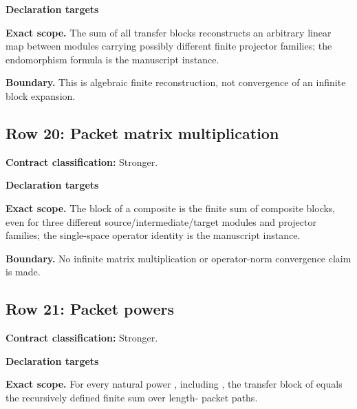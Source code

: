 \par\smallskip\textbf{Declaration targets}\par
{\small\noindent{}\par}
{\small\noindent{}\par}
\medskip\noindent\textbf{Exact scope.} The sum of all transfer blocks reconstructs an arbitrary linear map between modules carrying possibly different finite projector families; the endomorphism formula is the manuscript instance.
\par\smallskip\noindent\textbf{Boundary.} This is algebraic finite reconstruction, not convergence of an infinite block expansion.
\medskip
{}\subsection{Row 20: Packet matrix multiplication}
\label{row:20}
\textbf{Contract classification:} Stronger.
\par\smallskip\textbf{Declaration targets}\par
{\small\noindent{}\par}
{\small\noindent{}\par}
{\small\noindent{}\par}
\medskip\noindent\textbf{Exact scope.} The block of a composite is the finite sum of composite blocks, even for three different source/intermediate/target modules and projector families; the single-space operator identity is the manuscript instance.
\par\smallskip\noindent\textbf{Boundary.} No infinite matrix multiplication or operator-norm convergence claim is made.
\medskip
{}\subsection{Row 21: Packet powers}
\label{row:21}
\textbf{Contract classification:} Stronger.
\par\smallskip\textbf{Declaration targets}\par
{\small\noindent{}\par}
\medskip\noindent\textbf{Exact scope.} For every natural power , including , the transfer block of  equals the recursively defined finite sum over length- packet paths.

